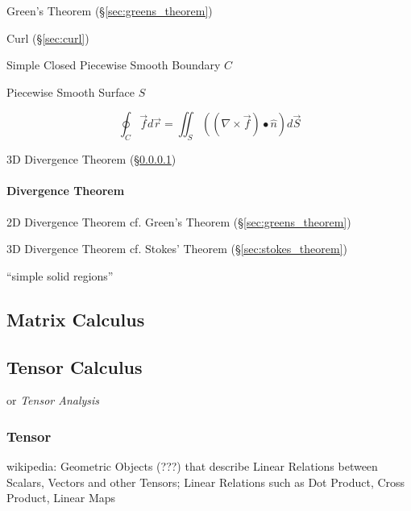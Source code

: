 \fist Green's Theorem (\S\ref{sec:greens_theorem})

Curl (\S\ref{sec:curl})

Simple Closed Piecewise Smooth Boundary $C$

Piecewise Smooth Surface $S$

\[
  \oint_C \vec{f} d\vec{r}
    = \iint_S ((\nabla \times \vec{f}) \bullet \hat{n}) d\vec{S}
\]

\fist 3D Divergence Theorem (\S\ref{sec:divergence_theorem})



\paragraph{Divergence Theorem}\label{sec:divergence_theorem}\hfill

2D Divergence Theorem \fist cf. Green's Theorem (\S\ref{sec:greens_theorem})

3D Divergence Theorem \fist cf. Stokes' Theorem (\S\ref{sec:stokes_theorem})

``simple solid regions''



\subsection{Matrix Calculus}\label{sec:matrix_calculus}

\subsection{Tensor Calculus}\label{sec:tensor_calculus}

or \emph{Tensor Analysis}



\subsubsection{Tensor}\label{sec:linear_tensor}

wikipedia: Geometric Objects (???) that describe Linear Relations
between Scalars, Vectors and other Tensors; Linear Relations such as
Dot Product, Cross Product, Linear Maps


